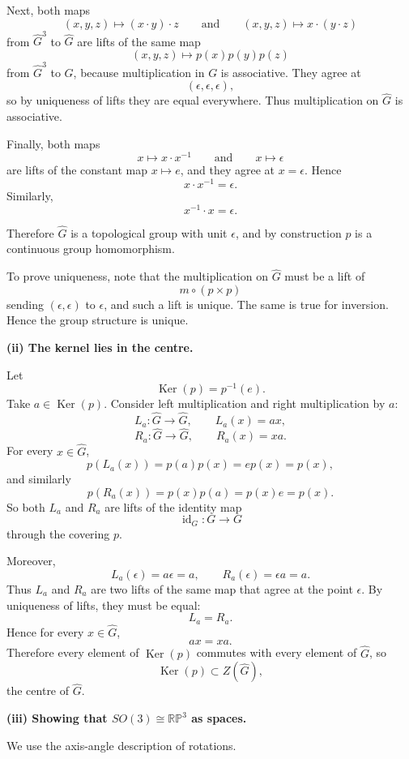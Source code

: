 \documentclass[12pt,a4paper]{article}
\theoremstyle{notespace}
\DeclareMathOperator{\Ker}{Ker}
\begin{document}
Next, both maps
\[
(x,y,z)\mapsto (x\cdot y)\cdot z
\qquad\text{and}\qquad
(x,y,z)\mapsto x\cdot (y\cdot z)
\]
from \(\widehat{G}^3\) to \(\widehat{G}\) are lifts of the same map
\[
(x,y,z)\mapsto p(x)p(y)p(z)
\]
from \(\widehat{G}^3\) to \(G\), because multiplication in \(G\) is associative. They agree at
\[
(\epsilon,\epsilon,\epsilon),
\]
so by uniqueness of lifts they are equal everywhere. Thus multiplication on \(\widehat{G}\) is associative.

Finally, both maps
\[
x\mapsto x\cdot x^{-1}
\qquad\text{and}\qquad
x\mapsto \epsilon
\]
are lifts of the constant map \(x\mapsto e\), and they agree at \(x=\epsilon\). Hence
\[
x\cdot x^{-1}=\epsilon.
\]
Similarly,
\[
x^{-1}\cdot x=\epsilon.
\]

Therefore \(\widehat{G}\) is a topological group with unit \(\epsilon\), and by construction \(p\) is a continuous group homomorphism.

To prove uniqueness, note that the multiplication on \(\widehat{G}\) must be a lift of
\[
m\circ (p\times p)
\]
sending \((\epsilon,\epsilon)\) to \(\epsilon\), and such a lift is unique. The same is true for inversion. Hence the group structure is unique.

\medskip

\textbf{(ii) The kernel lies in the centre.}

Let
\[
\Ker(p)=p^{-1}(e).
\]
Take \(a\in \Ker(p)\). Consider left multiplication and right multiplication by \(a\):
\[
L_a:\widehat{G}\to \widehat{G},
\qquad
L_a(x)=ax,
\]
\[
R_a:\widehat{G}\to \widehat{G},
\qquad
R_a(x)=xa.
\]
For every \(x\in \widehat{G}\),
\[
p(L_a(x))=p(a)p(x)=ep(x)=p(x),
\]
and similarly
\[
p(R_a(x))=p(x)p(a)=p(x)e=p(x).
\]
So both \(L_a\) and \(R_a\) are lifts of the identity map
\[
\operatorname{id}_G:G\to G
\]
through the covering \(p\).

Moreover,
\[
L_a(\epsilon)=a\epsilon=a,
\qquad
R_a(\epsilon)=\epsilon a=a.
\]
Thus \(L_a\) and \(R_a\) are two lifts of the same map that agree at the point \(\epsilon\). By uniqueness of lifts, they must be equal:
\[
L_a=R_a.
\]
Hence for every \(x\in \widehat{G}\),
\[
ax=xa.
\]
Therefore every element of \(\Ker(p)\) commutes with every element of \(\widehat{G}\), so
\[
\Ker(p)\subset Z(\widehat{G}),
\]
the centre of \(\widehat{G}\).

\medskip

\textbf{(iii) Showing that \(SO(3)\cong \mathbb{RP}^3\) as spaces.}

We use the axis-angle description of rotations.
\end{document}

